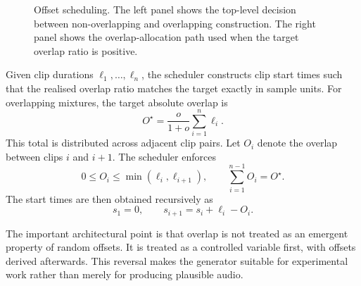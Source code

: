 \begin{figure}[ht]
\begin{minipage}[t]{0.48\linewidth}
{
}
\end{minipage}
\caption{Offset scheduling. The left panel shows the top-level decision between non-overlapping and overlapping construction. The right panel shows the overlap-allocation path used when the target overlap ratio is positive.}
\label{fig:offset_scheduling}
\end{figure}

Given clip durations $\ell_1,\ldots,\ell_n$, the scheduler constructs clip start times such that the realised overlap ratio matches the target exactly in sample units. For overlapping mixtures, the target absolute overlap is
\begin{equation}
O^{\star} = \frac{o}{1+o}\sum_{i=1}^{n} \ell_i.
\end{equation}
This total is distributed across adjacent clip pairs. Let $O_i$ denote the overlap between clips $i$ and $i+1$. The scheduler enforces
\begin{equation}
0 \leq O_i \leq \min(\ell_i, \ell_{i+1}),
\qquad
\sum_{i=1}^{n-1} O_i = O^{\star}.
\end{equation}
The start times are then obtained recursively as
\begin{equation}
 s_1 = 0,
 \qquad
 s_{i+1} = s_i + \ell_i - O_i.
\end{equation}

The important architectural point is that overlap is not treated as an emergent property of random offsets. It is treated as a controlled variable first, with offsets derived afterwards. This reversal makes the generator suitable for experimental work rather than merely for producing plausible audio.

